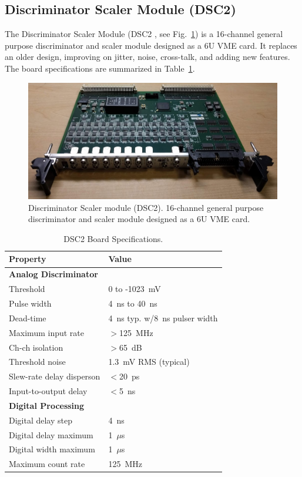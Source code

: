\subsection{Discriminator Scaler Module (DSC2)}

The Discriminator Scaler Module (DSC2 \cite{dsc2-ref}, see Fig.~\ref{fig:dsc2_board}) is a 16-channel general purpose discriminator and scaler module designed as a 6U VME card. It replaces an older design, improving on jitter, noise, cross-talk, and adding new features.  The board specifications are summarized in Table~\ref{tab:dsc2_specifications}. 

\begin{figure}[hbt]
	\centering
	\includegraphics[width=1.0\columnwidth,keepaspectratio]{img/dsc2_board.png}
	\caption{Discriminator Scaler module (DSC2). 16-channel general purpose discriminator and scaler module designed as a 6U VME card.}
	\label{fig:dsc2_board}
\end{figure}

\begin{table}
\begin{adjustbox}{width=\columnwidth,center}
	\begin{tabular}{| l | l |}
		\hline \hline
		Property			& Value				\\
		\hline
		{\bf Analog Discriminator}	&				\\
		Threshold			& 0 to -1023~mV			\\
		Pulse width			& 4~ns to 40~ns			\\
		Dead-time			& 4~ns typ. w/8~ns pulser width	\\
		Maximum input rate		& $>$125~MHz 			\\
		Ch-ch isolation			& $>$65~dB			\\
		Threshold noise			& 1.3~mV RMS (typical)		\\
		Slew-rate delay disperson	& $<$20~ps			\\
		Input-to-output delay		& $<$5~ns			\\
		{\bf Digital Processing}	&				\\
		Digital delay step		& 4~ns				\\
		Digital delay maximum		& 1~$\mu$s				\\
		Digital width maximum		& 1~$\mu$s				\\
		Maximum count rate		& 125~MHz			\\
		\hline \hline
	\end{tabular}
\end{adjustbox}
\caption{DSC2 Board Specifications.}
\label{tab:dsc2_specifications}
\end{table}


